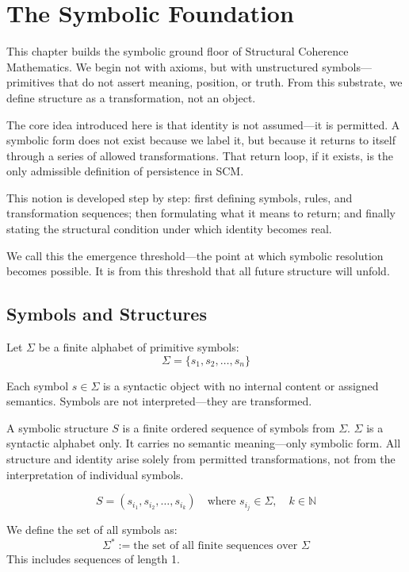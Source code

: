 \chapter{The Symbolic Foundation}
This chapter builds the symbolic ground floor of Structural Coherence Mathematics. We begin not with axioms, but with unstructured symbols---primitives that do not assert meaning, position, or truth. From this substrate, we define structure as a transformation, not an object.

The core idea introduced here is that identity is not assumed---it is permitted. A symbolic form does not exist because we label it, but because it returns to itself through a series of allowed transformations. That return loop, if it exists, is the only admissible definition of persistence in SCM.

This notion is developed step by step: first defining symbols, rules, and transformation sequences; then formulating what it means to return; and finally stating the structural condition under which identity becomes real.

We call this the emergence threshold---the point at which symbolic resolution becomes possible. It is from this threshold that all future structure will unfold.

\section{Symbols and Structures}
Let $\Sigma$ be a finite alphabet of primitive symbols:
\begin{equation} \label{eq:sigma}
\Sigma = \{ s_1, s_2, \dots, s_n \}
\end{equation}

Each symbol $s \in \Sigma$ is a syntactic object with no internal content or assigned semantics.  
Symbols are not interpreted—they are transformed.

A symbolic structure $S$ is a finite ordered sequence of symbols from $\Sigma$.  
$\Sigma$ is a syntactic alphabet only. It carries no semantic meaning—only symbolic form.  
All structure and identity arise solely from permitted transformations, not from the interpretation of individual symbols.

\begin{equation} \label{eq:symbolic-structure}
S = (s_{i_1}, s_{i_2}, \dots, s_{i_k}) \quad \text{where } s_{i_j} \in \Sigma,\quad k \in \mathbb{N}
\end{equation}

We define the set of all symbols as:
\begin{equation} \label{eq:all_symbolic-structures}
\Sigma^* := \text{the set of all finite sequences over } \Sigma
\end{equation}
This includes sequences of length 1.

